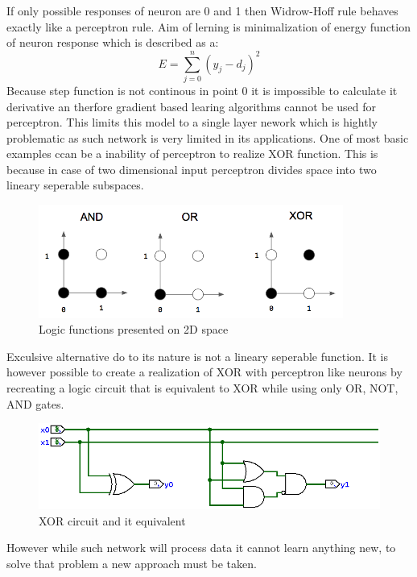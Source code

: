 If only possible responses of neuron are 0 and 1 then Widrow-Hoff rule behaves exactly like a
perceptron rule.
Aim of lerning is minimalization of energy function of neuron response which is described as a:
\begin{equation}
	E = \sum_{j=0}^{n}(y_{j}-d_{j})^{2}
\end{equation}
Because step function is not continous in point 0 it is impossible to calculate it derivative
an therfore gradient based learing algorithms cannot be used for perceptron.
This limits this model to a single layer nework which is hightly problematic as such network
is very limited in its applications.
One of most basic examples ccan be a inability of perceptron to realize XOR function.
This is because in case of two dimensional input perceptron divides space into two lineary
seperable subspaces.
\begin{figure}[h] 
	\centering
	\includegraphics[width=10cm]{res/logic_neuron}
	\caption{Logic functions presented on 2D space}
	\label{fig:logic_neuron}
\end{figure}
Exculsive alternative do to its nature is not a lineary seperable function. It is however
possible to create a realization of XOR with perceptron like neurons by recreating a logic
circuit that is equivalent to XOR while using only OR, NOT, AND gates.
\begin{figure}[ht] 
	\centering
	\includegraphics[width=\textwidth]{res/xor_circ}
	\caption{XOR circuit and it equivalent}
	\label{fig:xor_circ}
\end{figure}
However while such network will process data it cannot learn anything new, to solve that 
problem a new approach must be taken.

